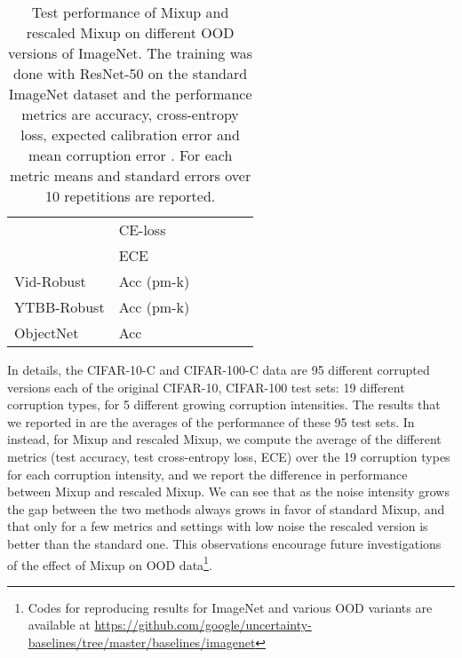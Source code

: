 \documentclass[twoside,11pt]{article}
\begin{document}
\begin{table}[H]
\begin{center}
\begin{small}
\begin{tabular}{l l c c c c }
        & CE-loss                   &                       &                         &                        &                       \\
        & ECE                   &                       &                         &                        &                       \\
        \midrule
        Vid-Robust & Acc (pm-k)  &                       &                         &                        &                       \\
        \midrule
        YTBB-Robust & Acc (pm-k)          &                       &                         &                        &                       \\
        \midrule
        ObjectNet & Acc &                       &                         &                        &                       \\
        \bottomrule
    \end{tabular}
    \end{small}
    \end{center}
    \caption{\small Test performance of Mixup and rescaled Mixup on different OOD versions of ImageNet.
    The training was done with ResNet-50 on the standard ImageNet dataset and the performance metrics are accuracy, cross-entropy loss, expected calibration error and mean corruption error \citep{hendrycks2019robustness}.
    For each metric means and standard errors over 10 repetitions are reported.}
    \label{tab:imagenet-ood}
\end{table}
In details, the CIFAR-10-C and CIFAR-100-C data are 95 different corrupted versions each of the original CIFAR-10, CIFAR-100 test sets: 
19 different corruption types, for 5 different growing corruption intensities. 
The results that we reported in  are the averages of the performance of 
these 95 test sets.
In  instead, for Mixup and rescaled Mixup, we compute the average of the different metrics 
(test accuracy, test cross-entropy loss, ECE) over the 19 corruption types for each corruption intensity, and we 
report the difference in performance between Mixup and rescaled Mixup.
We can see that as the noise intensity grows the gap between the two methods always grows in favor of standard Mixup, 
and that only for a few metrics and settings with low noise the rescaled version is better than the standard one.
This observations encourage future investigations of the effect of Mixup on OOD data\footnote{Codes for reproducing results for ImageNet and various OOD variants are available at \url{https://github.com/google/uncertainty-baselines/tree/master/baselines/imagenet}}.
\end{document}
